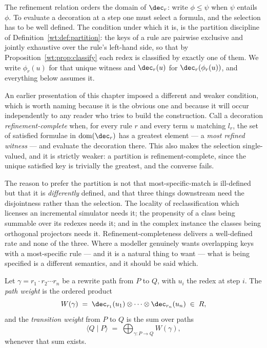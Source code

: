 The refinement relation orders the domain of $\dec_r$: write
$\phi \leq \psi$ when $\psi$ entails $\phi$.  To evaluate a decoration at
a step one must select a formula, and the selection has to be well
defined.  The condition under which it is, is the partition discipline of
Definition~\ref{wt:def:partition}: the keys of a rule are pairwise
exclusive and jointly exhaustive over the rule's left-hand side, so that
by Proposition~\ref{wt:prop:classify} each redex is classified by exactly
one of them.  We write $\phi_r(u)$ for that unique witness and $\dec_r(u)$
for $\dec_r(\phi_r(u))$, and everything below assumes it.

\begin{remark}
\label{def:refcomplete}
An earlier presentation of this chapter imposed a different and weaker
condition, which is worth naming because it is the obvious one and
because it will occur independently to any reader who tries to build the
construction.  Call a decoration \emph{refinement-complete} when, for
every rule $r$ and every term $u$ matching $l_r$, the set of satisfied
formulae in $\mathrm{dom}(\dec_r)$ has a greatest element --- a
\emph{most refined witness} --- and evaluate the decoration there.  This
also makes the selection single-valued, and it is strictly weaker: a
partition is refinement-complete, since the unique satisfied key is
trivially the greatest, and the converse fails.

The reason to prefer the partition is not that most-specific-match is
ill-defined but that it is \emph{differently} defined, and that three
things downstream need the disjointness rather than the selection.  The
locality of reclassification which licenses an incremental simulator
needs it; the propensity of a class being summable over its redexes needs
it; and in the complex instance the classes being orthogonal projectors
needs it.  Refinement-completeness delivers a well-defined rate and none
of the three.  Where a modeller genuinely wants overlapping keys with a
most-specific rule --- and it is a natural thing to want --- what is being
specified is a different semantics, and it should be said which.
\end{remark}

\begin{definition}
\label{def:pathweight}
Let $\gamma = r_1 \cdot r_2 \cdots r_n$ be a rewrite path from $P$ to $Q$,
with $u_i$ the redex at step $i$.  The \emph{path weight} is the ordered
product
\[
  W(\gamma) \;=\; \dec_{r_1}(u_1) \otimes \cdots \otimes \dec_{r_n}(u_n)
  \;\in\; R,
\]
and the \emph{transition weight} from $P$ to $Q$ is the sum over paths
\[
  \langle Q \mid P \rangle \;=\; \bigoplus_{\gamma : P \to Q} W(\gamma),
\]
whenever that sum exists.
\end{definition}

